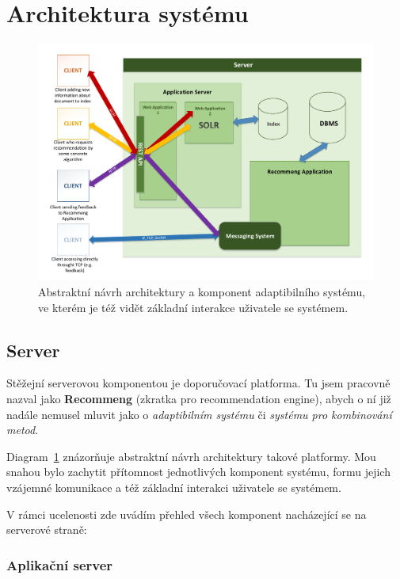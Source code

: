 \documentclass[thesis=M,czech]{FITthesis}[2014/05/07]
\begin{document}
\section{Architektura systému}

\begin{figure}\centering
	\includegraphics[width=1.0\textwidth]{obr/DIPLOMKA_env.pdf}
 	\caption[Abstraktní návrh architektury a komponent adaptibilního systému]{Abstraktní návrh architektury a komponent adaptibilního systému, ve kterém je též vidět základní interakce uživatele se systémem.}\label{fig:recommeng}
\end{figure}	

\subsection{Server}

Stěžejní serverovou komponentou je doporučovací platforma. Tu jsem pracovně nazval jako \textbf{Recommeng} (zkratka pro recommendation engine), abych o ní již nadále nemusel mluvit jako o \emph{adaptibilním systému} či \emph{systému pro kombinování metod}. 

Diagram~\ref{fig:recommeng} znázorňuje abstraktní návrh architektury takové platformy. Mou snahou bylo zachytit přítomnost jednotlivých komponent systému, formu jejich vzájemné komunikace a též základní interakci uživatele se systémem.

V rámci ucelenosti zde uvádím přehled všech komponent nacházející se na serverové straně:

\subsubsection{Aplikační server}
\end{document}
